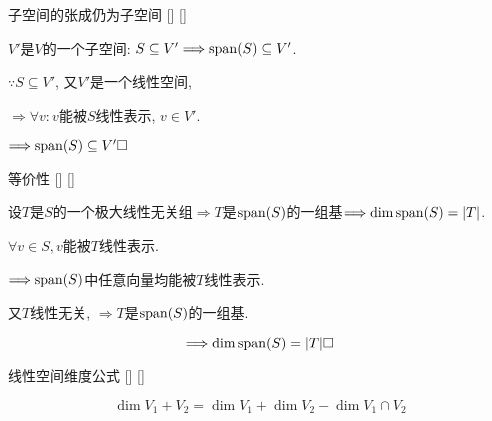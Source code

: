 \documentclass[UTF8]{ctexart}
\begin{document}
		\begin{ppt}
			[]
			{子空间的张成仍为子空间}
			[]
			[]

			$V'$是$V$的一个子空间: $S\subseteq V'\Longrightarrow{\rm span}(S)\subseteq V'$. 
		\end{ppt}
  
		\begin{prf}
			
			$\because S\subseteq V'$, 又$V'$是一个线性空间, 
			
			$\Longrightarrow \forall v: v$能被$S$线性表示, $v\in V'$. 
			
			$\Longrightarrow {\rm span}(S)\subseteq V' \square$
        \end{prf}
		
		\begin{ppt}
			[]
			{等价性}
			[]
			[]

			设$T$是$S$的一个极大线性无关组$\Longrightarrow T$是${\rm span}(S)$的一组基$\Longrightarrow\dim {\rm span}(S)=|T|$. 
		\end{ppt}
  
        \begin{prf}
			
			$\forall v\in S, v$能被$T$线性表示. 
			
			$\Longrightarrow {\rm span}(S)$中任意向量均能被$T$线性表示. 
			
			又$T$线性无关, $\Longrightarrow T$是${\rm span}(S)$的一组基. 
			
			$$\Longrightarrow \dim{\rm span}(S)=|T|\square$$
        \end{prf}
		
		\begin{thm}
			[]
			{线性空间维度公式}
			[]
			[]

			$$\dim V_{1}+V_{2}=\dim V_{1}+\dim V_{2}-\dim V_{1}\cap V_{2}$$
		\end{thm}
\end{document}

